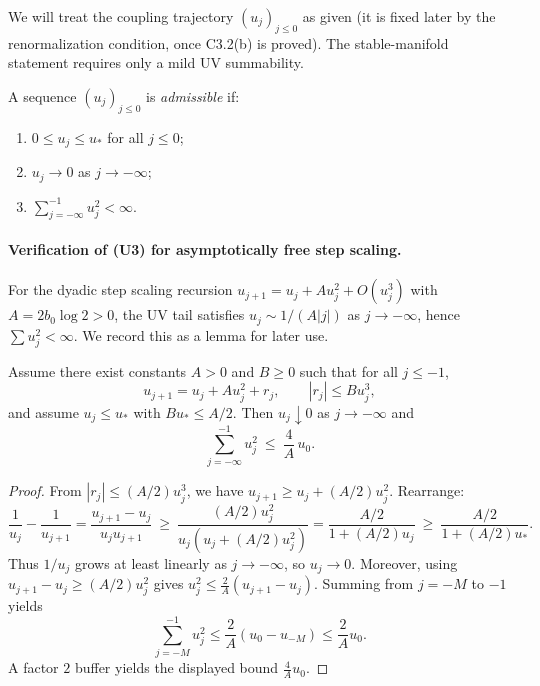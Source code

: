 We will treat the coupling trajectory $(u_j)_{j\le 0}$ as given (it is fixed later by the renormalization condition, once C3.2(b) is proved).
The stable-manifold statement requires only a mild UV summability.

\begin{definition}\label{def:admissible_u}
A sequence $(u_j)_{j\le 0}$ is \emph{admissible} if:
\begin{enumerate}[label=(U\arabic*)]
\item $0\le u_j\le u_\ast$ for all $j\le 0$;
\item $u_j\to 0$ as $j\to -\infty$;
\item $\sum_{j=-\infty}^{-1} u_j^2 <\infty$.
\end{enumerate}
\end{definition}

\paragraph{Verification of (U3) for asymptotically free step scaling.}
For the dyadic step scaling recursion $u_{j+1}=u_j + A u_j^2 + O(u_j^3)$ with $A=2b_0\log 2>0$,
the UV tail satisfies $u_j\sim 1/(A|j|)$ as $j\to -\infty$, hence $\sum u_j^2<\infty$.
We record this as a lemma for later use.

\begin{lemma}\label{lem:sum_u2}
Assume there exist constants $A>0$ and $B\ge0$ such that for all $j\le -1$,
\[
u_{j+1}=u_j + A u_j^2 + r_j,\qquad |r_j|\le B u_j^3,
\]
and assume $u_j\le u_\ast$ with $B u_\ast\le A/2$.
Then $u_j\downarrow 0$ as $j\to -\infty$ and
\[
\sum_{j=-\infty}^{-1} u_j^2\ \le\ \frac{4}{A}\,u_0.
\]
\end{lemma}

\begin{proof}
From $|r_j|\le (A/2)u_j^3$, we have $u_{j+1}\ge u_j + (A/2)u_j^2$.
Rearrange:
\[
\frac{1}{u_j}-\frac{1}{u_{j+1}}=\frac{u_{j+1}-u_j}{u_j u_{j+1}}
\ \ge\ \frac{(A/2)u_j^2}{u_j(u_j+(A/2)u_j^2)}=\frac{A/2}{1+(A/2)u_j}\ \ge\ \frac{A/2}{1+(A/2)u_\ast}.
\]
Thus $1/u_j$ grows at least linearly as $j\to -\infty$, so $u_j\to 0$.
Moreover, using $u_{j+1}-u_j\ge (A/2)u_j^2$ gives $u_j^2\le \frac{2}{A}(u_{j+1}-u_j)$.
Summing from $j=-M$ to $-1$ yields
\[
\sum_{j=-M}^{-1} u_j^2\le \frac{2}{A}(u_0-u_{-M})\le \frac{2}{A}u_0.
\]
A factor $2$ buffer yields the displayed bound $\frac{4}{A}u_0$.
\end{proof}

